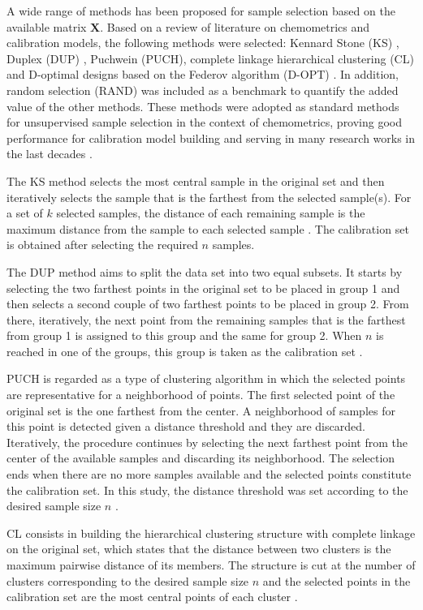 \documentclass[journal=ancham,manuscript=article]{achemso}
\begin{document}
A wide range of methods has been proposed for sample selection based on the available matrix $\mathbf{X}$. Based on a review of literature on chemometrics and calibration models, the following methods were selected: Kennard Stone (KS) \cite{Kennard1969}, Duplex (DUP) \cite{Snee1977}, Puchwein (PUCH)\cite{Puchwein1988}, complete linkage hierarchical clustering (CL) \cite{Naes1990} and D-optimal designs based on the Federov algorithm (D-OPT) \cite{Goos2011}. In addition, random selection (RAND) was included  as a benchmark to quantify the added value of the other methods. These methods were adopted as standard methods for unsupervised sample selection in the context of chemometrics, proving good performance for calibration model building and serving in many research works in the last decades \cite{Naes1990, Brandmaier2012, Saeys2019, Au2020, Aernouts2011}.

The KS method selects the most central sample in the original set and then iteratively selects the sample that is the farthest from the selected sample(s). For a set of $k$ selected samples, the distance of each remaining sample is the maximum distance from the sample to each selected sample \cite{Kennard1969}. The calibration set is obtained after selecting the required $n$ samples.

The DUP method aims to split the data set into two equal subsets. It starts by selecting the two farthest points in the original set to be placed in group 1 and then selects a second couple of two farthest points to be placed in group 2. From there, iteratively, the next point from the remaining samples that is the farthest from group 1 is assigned to this group and the same for group 2. When $n$ is reached in one of the groups, this group is taken as the calibration set \cite{Snee1977}.

PUCH is regarded as a type of clustering algorithm in which the selected points are representative for a neighborhood of points. The first selected point of the original set is the one farthest from the center. A neighborhood of samples for this point is detected given a distance threshold and they are discarded. Iteratively, the procedure continues by selecting the next farthest point from the center of the available samples and discarding its neighborhood. The selection ends when there are no more samples available and the selected points constitute the calibration set. In this study, the distance threshold was set according to the desired sample size $n$ \cite{Puchwein1988}.

CL consists in building the hierarchical clustering structure with complete linkage on the original set, which states that the distance between two clusters is the maximum pairwise distance of its members. The structure is cut at the number of clusters corresponding to the desired sample size $n$ and the selected points in the calibration set are the most central points of each cluster \cite{Naes1990}.
\end{document}
